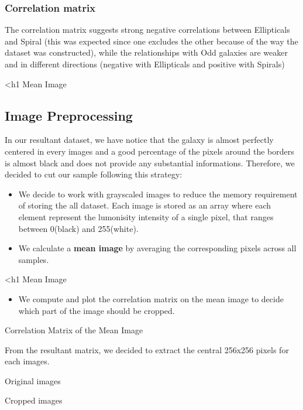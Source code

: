 \documentclass[11pt]{article}
\providecommand{\tightlist}{%
      \setlength{\itemsep}{0pt}\setlength{\parskip}{0pt}}
\begin{document}
    \subsubsection{Correlation matrix}\label{correlation-matrix}

The correlation matrix suggests strong negative correlations between
Ellipticals and Spiral (this was expected since one excludes the other
because of the way the dataset was constructed), while the relationships
with Odd galaxies are weaker and in different directions (negative with
Ellipticals and positive with Spirals)

\textless h1 Mean Image

    \subsection{Image Preprocessing}\label{image-preprocessing}

In our resultant dataset, we have notice that the galaxy is almost
perfectly centered in every images and a good percentage of the pixels
around the borders is almost black and does not provide any substantial
informations. Therefore, we decided to cut our sample following this
strategy:

\begin{itemize}
\item
  We decide to work with grayscaled images to reduce the memory
  requirement of storing the all dataset. Each image is stored as an
  array where each element represent the lumonisity intensity of a
  single pixel, that ranges between 0(black) and 255(white).
\item
  We calculate a \textbf{mean image} by averaging the corresponding
  pixels across all samples.
\end{itemize}

\textless h1 Mean Image

\begin{itemize}
\tightlist
\item
  We compute and plot the correlation matrix on the mean image to decide
  which part of the image should be cropped.
\end{itemize}

Correlation Matrix of the Mean Image

From the resultant matrix, we decided to extract the central 256x256
pixels for each images.

Original images

Cropped images
\end{document}
